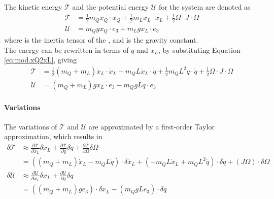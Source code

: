 The kinetic energy $ \mathcal{T} $ and the potential energy $ \mathcal{U} $ for the system are denoted as
\begin{equation}\label{key}
\begin{aligned}
\mathcal{T}&=\frac{1}{2}m_Q\dot{x}_Q\cdot\dot{x}_Q+\frac{1}{2}m_L\dot{x}_L\cdot\dot{x}_L+\frac{1}{2}\Omega \cdot J\cdot\Omega\\
\mathcal{U}&=m_Qgx_Q\cdot e_3+m_Lgx_L\cdot e_3
\end{aligned}
\end{equation}
where  is the inertia tensor of the , and  is the gravity constant.\\
The energy can be rewritten in terms of $ q $ and $ x_L $, by substituting Equation \ref{eq:mod.xQ2xL}, giving
\begin{align}\label{key}
\mathcal{T}&=\frac{1}{2}(m_Q+m_L)\dot{x}_L\cdot\dot{x}_L -m_QL\dot{x}_L\cdot\dot{q} + \frac{1}{2}m_QL^2\dot{q}\cdot\dot{q}+\frac{1}{2}\Omega \cdot J\cdot\Omega\\
\mathcal{U}&=(m_Q+m_L)gx_L\cdot e_3-m_QgLq\cdot e_3
\end{align}
\paragraph{Variations} The variations of $ \mathcal{T} $ and $ \mathcal{U} $ are approximated by a first-order Taylor approximation, which results in
\begin{equation}\label{eq:mod.T}
\begin{aligned}
\delta\mathcal{T}&\approx \frac{\partial \mathcal{T}}{\partial\dot{x}_L} \delta\dot{x}_L+\frac{\partial \mathcal{T}}{\partial\dot{q}}\delta\dot{q}+\frac{\partial \mathcal{T}}{\partial\Omega}\delta\Omega\\
&=((m_Q+m_L)\dot{x}_L-m_QL\dot{q})\cdot\delta\dot{x}_L+(-m_QL\dot{x}_L+m_QL^2\dot{q})\cdot\delta\dot{q}+(J\Omega)\cdot\delta\Omega\\
%
\delta\mathcal{U}&\approx \frac{\partial \mathcal{U}}{\partial{x}_L} \delta{x}_L +\frac{\partial \mathcal{U}}{\partial{q}}\delta{q}\\
&=((m_Q+m_L)ge_3)\cdot\delta x_L-(m_QgLe_3)\cdot\delta q
\end{aligned}
\end{equation}

